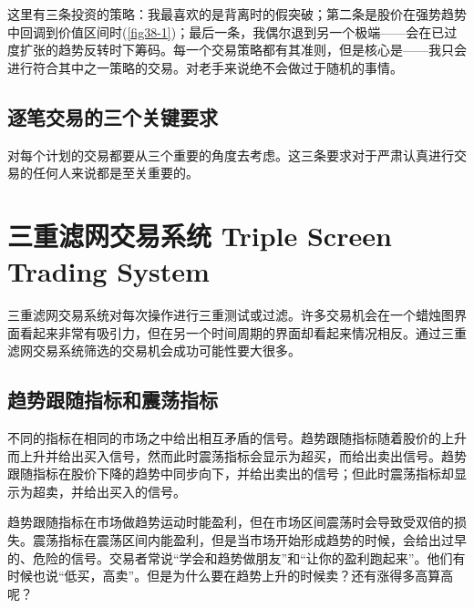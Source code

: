 这里有三条投资的策略：我最喜欢的是背离时的假突破；第二条是股价在强势趋势中回调到价值区间时(\autoref{fig38-1})；最后一条，我偶尔退到另一个极端——会在已过度扩张的趋势反转时下筹码。每一个交易策略都有其准则，但是核心是——我只会进行符合其中之一策略的交易。对老手来说绝不会做过于随机的事情。
\subsection*{逐笔交易的三个关键要求}
对每个计划的交易都要从三个重要的角度去考虑。这三条要求对于严肃认真进行交易的任何人来说都是至关重要的。
\section{三重滤网交易系统 Triple Screen Trading System}
三重滤网交易系统对每次操作进行三重测试或过滤。许多交易机会在一个蜡烛图界面看起来非常有吸引力，但在另一个时间周期的界面却看起来情况相反。通过三重滤网交易系统筛选的交易机会成功可能性要大很多。
\subsection*{趋势跟随指标和震荡指标}
不同的指标在相同的市场之中给出相互矛盾的信号。趋势跟随指标随着股价的上升而上升并给出买入信号，然而此时震荡指标会显示为超买，而给出卖出信号。趋势跟随指标在股价下降的趋势中同步向下，并给出卖出的信号；但此时震荡指标却显示为超卖，并给出买入的信号。

趋势跟随指标在市场做趋势运动时能盈利，但在市场区间震荡时会导致受双倍的损失。震荡指标在震荡区间内能盈利，但是当市场开始形成趋势的时候，会给出过早的、危险的信号。交易者常说“学会和趋势做朋友”和“让你的盈利跑起来”。他们有时候也说“低买，高卖”。但是为什么要在趋势上升的时候卖？还有涨得多高算高呢？
